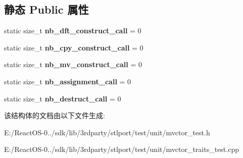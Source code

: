 \subsection*{静态 Public 属性}
\begin{DoxyCompactItemize}
\item 
\mbox{\label{struct_movable_struct_a85e1104c62eb9ed7e2ed904868844a4c}} 
static size\+\_\+t {\bfseries nb\+\_\+dft\+\_\+construct\+\_\+call} = 0
\item 
\mbox{\label{struct_movable_struct_a9e474ab9cb0b1c98acce85a27d34b15c}} 
static size\+\_\+t {\bfseries nb\+\_\+cpy\+\_\+construct\+\_\+call} = 0
\item 
\mbox{\label{struct_movable_struct_a8e505c8d16b6316a1096e3b0cf1f3661}} 
static size\+\_\+t {\bfseries nb\+\_\+mv\+\_\+construct\+\_\+call} = 0
\item 
\mbox{\label{struct_movable_struct_afe3df43d61c32c5377e26775252a1db0}} 
static size\+\_\+t {\bfseries nb\+\_\+assignment\+\_\+call} = 0
\item 
\mbox{\label{struct_movable_struct_adabff661e31d9b94cf36441b129a1c1d}} 
static size\+\_\+t {\bfseries nb\+\_\+destruct\+\_\+call} = 0
\end{DoxyCompactItemize}


该结构体的文档由以下文件生成\+:\begin{DoxyCompactItemize}
\item 
E\+:/\+React\+O\+S-\/0../sdk/lib/3rdparty/stlport/test/unit/mvctor\+\_\+test.\+h\item 
E\+:/\+React\+O\+S-\/0../sdk/lib/3rdparty/stlport/test/unit/mvctor\+\_\+traits\+\_\+test.\+cpp\end{DoxyCompactItemize}
